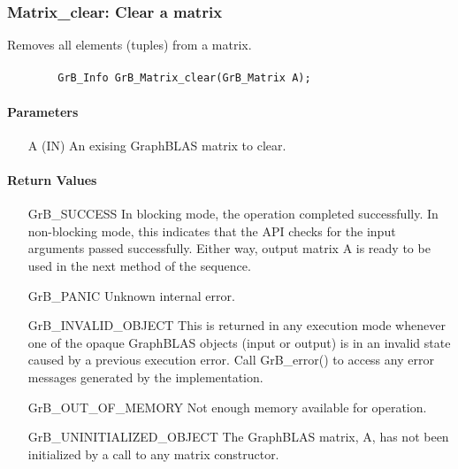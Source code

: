 \subsubsection{{\sf Matrix\_clear}: Clear a matrix}

Removes all elements (tuples) from a matrix.

\paragraph{\syntax}

\begin{verbatim}
        GrB_Info GrB_Matrix_clear(GrB_Matrix A);
\end{verbatim}

\paragraph{Parameters}

\begin{itemize}[leftmargin=1.1in]
    \item[{\sf A}] ({\sf IN}) An exising GraphBLAS matrix to clear.
\end{itemize}

\paragraph{Return Values}

\begin{itemize}[leftmargin=2.1in]
    \item[{\sf GrB\_SUCCESS}]         In blocking mode, the operation completed
    successfully. In non-blocking mode, this indicates that the API checks 
    for the input arguments passed successfully. Either way, output matrix 
    {\sf A} is ready to be used in the next method of the sequence.

    \item[{\sf GrB\_PANIC}]           Unknown internal error.
    
    \item[{\sf GrB\_INVALID\_OBJECT}] This is returned in any execution mode 
    whenever one of the opaque GraphBLAS objects (input or output) is in an invalid 
    state caused by a previous execution error.  Call {\sf GrB\_error()} to access 
    any error messages generated by the implementation.

    \item[{\sf GrB\_OUT\_OF\_MEMORY}] Not enough memory available for operation.
    
    \item[{\sf GrB\_UNINITIALIZED\_OBJECT}]  The GraphBLAS matrix, {\sf A}, has 
    not been initialized by a call to any matrix constructor.
    
\end{itemize}

